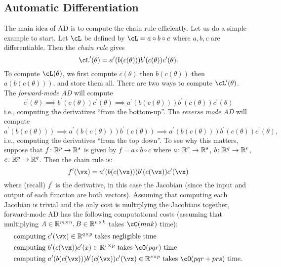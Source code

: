 \documentclass[../../book-main.tex]{subfiles}
\begin{document}
\subsection{Automatic Differentiation}

The main idea of AD is to compute the chain rule efficiently. Let us do a simple example to start. Let \(\cL\) be defined by \(\cL = a \circ b \circ c\) where \(a, b, c\) are differentiable. Then the \textit{chain rule} gives
\begin{equation}
    \cL^{\prime}(\theta) = a^{\prime}(b(c(\theta)))b^{\prime}(c(\theta))c^{\prime}(\theta).
\end{equation}
To compute \(\cL(\theta)\), we first compute \(c(\theta)\) then \(b(c(\theta))\) then \(a(b(c(\theta)))\), and store them all. There are two ways to compute \(\cL^{\prime}(\theta)\). The \textit{forward-mode AD} will compute 
\begin{equation}
    c^{\prime}(\theta) \implies b^{\prime}(c(\theta))c^{\prime}(\theta) \implies a^{\prime}(b(c(\theta)))b^{\prime}(c(\theta))c^{\prime}(\theta)
\end{equation}
i.e., computing the derivatives ``from the bottom-up''. The \textit{reverse mode AD} will compute 
\begin{equation}
    a^{\prime}(b(c(\theta))) \implies a^{\prime}(b(c(\theta)))b^{\prime}(c(\theta)) \implies a^{\prime}(b(c(\theta)))b^{\prime}(c(\theta))c^{\prime}(\theta),
\end{equation}
i.e., computing the derivatives ``from the top down''. To see why this matters, suppose that \(f \colon \mathbb{R}^{p} \to \mathbb{R}^{s}\) is given by \(f = a \circ b \circ c\) where \(a \colon \mathbb{R}^{r} \to \mathbb{R}^{s}\), \(b \colon \mathbb{R}^{q} \to \mathbb{R}^{r}\), \(c \colon \mathbb{R}^{p} \to \mathbb{R}^{q}\). Then the chain rule is:
\begin{equation}
    f^{\prime}(\vx) = a^{\prime}(b(c(\vx)))b^{\prime}(c(\vx))c^{\prime}(\vx)
\end{equation}
where (recall) \(f^{\prime}\) is the derivative, in this case the Jacobian (since the input and output of each function are both vectors). Assuming that computing each Jacobian is trivial and the only cost is multiplying the Jacobians together, forward-mode AD has the following computational costs (assuming that multiplying \(A \in \mathbb{R}^{m \times n}, B \in \mathbb{R}^{n \times k}\) takes \(\cO(mnk)\) time):
\begin{align}
    &\text{computing}\ c^{\prime}(\vx) \in \R^{q \times p}\ \text{takes negligible time} \\
    &\text{computing}\ b^{\prime}(c(\vx))c^{\prime}(x) \in \R^{r \times p}\ \text{takes \(\cO(pqr)\) time} \\
    &\text{computing}\ a^{\prime}(b(c(\vx)))b^{\prime}(c(\vx))c^{\prime}(\vx) \in \R^{s \times p}\ \text{takes \(\cO(pqr + prs)\) time.}
\end{align}
\end{document}
